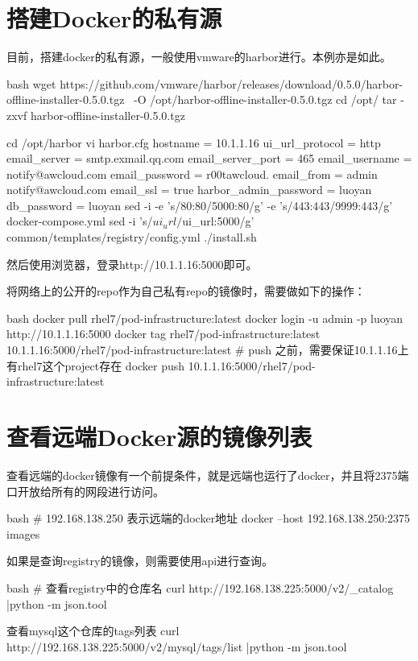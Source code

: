 \section{搭建Docker的私有源}
目前，搭建docker的私有源，一般使用vmware的harbor进行。本例亦是如此。
\begin{code-block}{bash}
wget https://github.com/vmware/harbor/releases/download/0.5.0/harbor-offline-installer-0.5.0.tgz \
    -O /opt/harbor-offline-installer-0.5.0.tgz
cd /opt/
tar -zxvf harbor-offline-installer-0.5.0.tgz

cd /opt/harbor
vi harbor.cfg
hostname = 10.1.1.16
ui_url_protocol = http
email_server = smtp.exmail.qq.com
email_server_port = 465
email_username = notify@awcloud.com
email_password = r00tawcloud.
email_from = admin notify@awcloud.com
email_ssl = true
harbor_admin_password = luoyan
db_password = luoyan
sed -i -e 's/80:80/5000:80/g' -e 's/443:443/9999:443/g' docker-compose.yml
sed -i 's/$ui_url/$ui_url:5000/g' common/templates/registry/config.yml
./install.sh
\end{code-block}

然后使用浏览器，登录http://10.1.1.16:5000即可。

将网络上的公开的repo作为自己私有repo的镜像时，需要做如下的操作：
\begin{code-block}{bash}
docker pull rhel7/pod-infrastructure:latest
docker login -u admin -p luoyan http://10.1.1.16:5000
docker tag rhel7/pod-infrastructure:latest 10.1.1.16:5000/rhel7/pod-infrastructure:latest
# push 之前，需要保证10.1.1.16上有rhel7这个project存在
docker push 10.1.1.16:5000/rhel7/pod-infrastructure:latest
\end{code-block}

\section{查看远端Docker源的镜像列表}
查看远端的docker镜像有一个前提条件，就是远端也运行了docker，并且将2375端口开放给所有的网段进行访问。
\begin{code-block}{bash}
# 192.168.138.250 表示远端的docker地址
docker --host 192.168.138.250:2375 images
\end{code-block}

如果是查询registry的镜像，则需要使用api进行查询。
\begin{code-block}{bash}
# 查看registry中的仓库名
curl http://192.168.138.225:5000/v2/_catalog |python -m json.tool

查看mysql这个仓库的tags列表
curl http://192.168.138.225:5000/v2/mysql/tags/list |python -m json.tool
\end{code-block}

